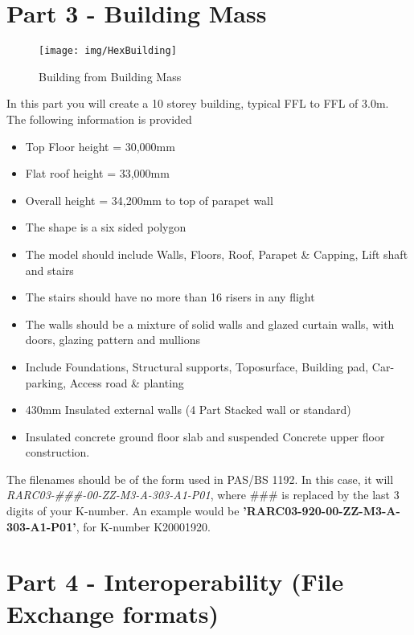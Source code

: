 \newpage

\section*{Part 3 - Building Mass}


\begin{figure}
	\centering
	\texttt{[image: img/HexBuilding]}
	\caption{Building from Building Mass}
	\label{fig:hexbuilding}
\end{figure}



In this part you will create a 10 storey building, typical FFL to FFL of 3.0m. The following information is provided
\begin{itemize}
	\item Top Floor height = 30,000mm
	\item Flat roof height = 33,000mm
	\item Overall height = 34,200mm to top of parapet wall
	\item The shape is a six sided polygon
	\item The model should include Walls, Floors, Roof, Parapet \& Capping, Lift shaft and stairs
	\item The stairs should have no more than 16 risers in any flight
	\item The walls should be a mixture of solid walls and glazed curtain walls, with doors, glazing pattern and mullions
	\item Include Foundations, Structural supports, Toposurface, Building pad, Car-parking, Access road \& planting
	\item 430mm Insulated external walls (4 Part Stacked wall or standard)
	\item Insulated concrete ground floor slab and suspended Concrete upper floor construction.
\end{itemize}

The filenames should be of the form used in PAS/BS 1192.  In this case, it will \textit{RARC03-\#\#\#-00-ZZ-M3-A-303-A1-P01}, where \#\#\# is replaced by the last 3 digits of your K-number. An example would be \textbf{'RARC03-920-00-ZZ-M3-A-303-A1-P01'}, for K-number K20001920.


\newpage

\section*{Part 4 - Interoperability (File Exchange formats)}

